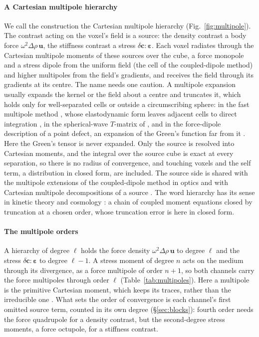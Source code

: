 \documentclass[preprint,review,12pt]{elsarticle}
\begin{document}
\paragraph{A Cartesian multipole hierarchy} We call the construction the Cartesian multipole
hierarchy (Fig.~\ref{fig:multipole}). The contrast acting on the voxel's field is a source: the density
contrast a body force $\omega^2\Delta\rho\,\mathbf{u}$, the stiffness contrast a stress
$\delta\mathbf{c}:\boldsymbol\varepsilon$. Each voxel radiates through the Cartesian multipole moments of
these sources over the cube, a force monopole and a stress dipole from the uniform field (the cell of the
coupled-dipole method) and higher multipoles from the field's gradients, and receives the field through
its gradients at its centre. The name needs one caution. A multipole expansion usually expands the kernel
or the field about a centre and truncates it, which holds only for well-separated cells or outside a
circumscribing sphere: in the fast multipole method \citep{CarrierGreengardRokhlin1988}, whose
elastodynamic form leaves adjacent cells to direct integration \citep{ChaillatBonnetSemblat2007}, in the
spherical-wave $T$-matrix of \citet{Waterman1976}, and in the force-dipole description of a point defect,
an expansion of the Green's function far from it \citep{Clouet2018}. Here the Green's tensor is never
expanded. Only the source is resolved into Cartesian moments, and the integral over the source cube is
exact at every separation, so there is no radius of convergence, and touching voxels and the self term,
a distribution in closed form, are included. The source side is shared with the multipole extensions of
the coupled-dipole method in optics \citep{Evlyukhin2011,Ustimenko2022} and with Cartesian multipole
decompositions of a source \citep{Riccardi2022}. The word hierarchy has its sense in kinetic theory and
cosmology \citep{MaBertschinger1995}: a chain of coupled moment equations closed by truncation at a
chosen order, whose truncation error is here in closed form.

\paragraph{The multipole orders} A hierarchy of degree $\ell$ holds the force density $\omega^2\Delta\rho\,
\mathbf{u}$ to degree $\ell$ and the stress $\delta\mathbf{c}:\boldsymbol\varepsilon$ to degree $\ell-1$.
A stress moment of degree $n$ acts on the medium through its divergence, as a force multipole of order
$n+1$, so both channels carry the force multipoles through order $\ell$ (Table~\ref{tab:multipoles}).
Here a multipole is the primitive Cartesian moment, which keeps its traces, rather than the irreducible
one \citep{Riccardi2022}. What sets the order of convergence is each channel's first omitted source
term, counted in its own degree (\S\ref{sec:blocks}): fourth order needs the force quadrupole for a
density contrast, but the second-degree stress moments, a force octupole, for a stiffness contrast.
\end{document}
